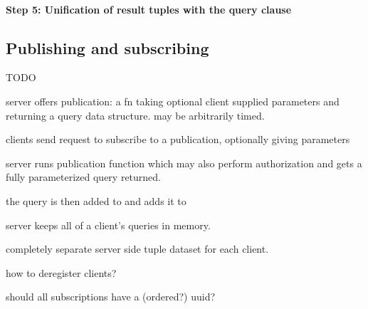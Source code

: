 \paragraph{Step 5: Unification of result tuples with the query clause}


\subsection{Publishing and subscribing}

TODO

server offers publication: a fn taking optional client supplied parameters and returning a query data structure. may be arbitrarily timed.

clients send request to subscribe to a publication, optionally giving parameters

server runs publication function which may also perform authorization and gets a fully parameterized query returned.

the query is then added to and adds it to

server keeps all of a client's queries in memory.

completely separate server side tuple dataset for each client.

how to deregister clients?

should all subscriptions have a (ordered?) uuid?
